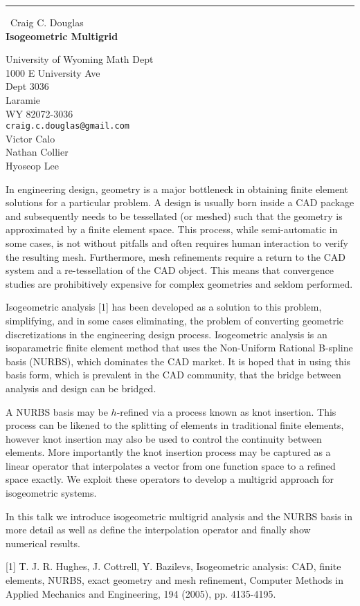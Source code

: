 \documentclass{report}
\begin{document}
\begin{center}
\rule{6in}{1pt} \
{\large Craig C. Douglas \\
{\bf Isogeometric Multigrid }}

University of Wyoming Math Dept \\ 1000 E University Ave  \\ Dept 3036 \\ Laramie \\ WY 82072-3036
\\
{\tt craig.c.douglas@gmail.com}\\
Victor Calo\\
Nathan Collier\\
Hyoseop Lee\end{center}

In engineering design, geometry is a major bottleneck in
obtaining finite element solutions for a particular problem.
A design is usually born inside a CAD package and
subsequently needs to be tessellated (or meshed) such that
the geometry is approximated by a finite element space.
This process, while semi-automatic in some cases, is not
without pitfalls and often requires human interaction to
verify the resulting mesh. Furthermore, mesh refinements
require a return to the CAD system and a re-tessellation of
the CAD object. This means that convergence studies are
prohibitively expensive for complex geometries and seldom
performed.

Isogeometric analysis [1] has been developed as a solution
to this problem, simplifying, and in some cases eliminating,
the problem of converting geometric discretizations in the
engineering design process. Isogeometric analysis is an
isoparametric finite element method that uses the
Non-Uniform Rational B-spline basis (NURBS), which dominates
the CAD market. It is hoped that in using this basis form,
which is prevalent in the CAD community, that the bridge
between analysis and design can be bridged.

A NURBS basis may be $h$-refined via a process known as knot
insertion. This process can be likened to the splitting of
elements in traditional finite elements, however knot
insertion may also be used to control the continuity between
elements. More importantly the knot insertion process may
be captured as a linear operator that interpolates a vector
from one function space to a refined space exactly. We
exploit these operators to develop a multigrid approach for
isogeometric systems.

In this talk we introduce isogeometric multigrid analysis
and the NURBS basis in more detail as well as define the
interpolation operator and finally show numerical results.

[1] T. J. R. Hughes, J. Cottrell, Y. Bazilevs, Isogeometric
analysis: CAD, finite elements, NURBS, exact geometry and
mesh refinement, Computer Methods in Applied Mechanics and
Engineering, 194 (2005), pp. 4135-4195.
\end{document}
